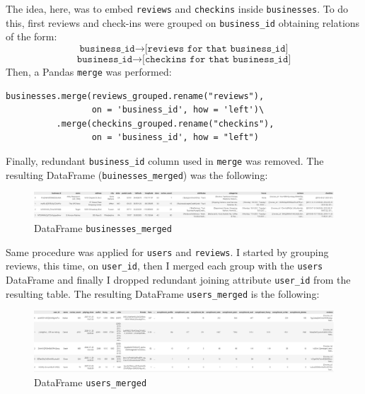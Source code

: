 \documentclass{Configuration_Files/PoliMi3i_thesis}
\begin{document}
The idea, here, was to embed \texttt{reviews} and \texttt{checkins} inside \texttt{businesses}. To do this, first reviews and check-ins were grouped on \texttt{business\_id} obtaining relations of the form:
$$\texttt{business\_id} \longrightarrow \texttt{[reviews for that business\_id]}$$
$$\texttt{business\_id} \longrightarrow \texttt{[checkins for that business\_id]}$$
Then, a Pandas \texttt{merge} was performed:

\bigskip

\begin{verbatim}
businesses.merge(reviews_grouped.rename("reviews"), 
                 on = 'business_id', how = 'left')\
          .merge(checkins_grouped.rename("checkins"), 
                 on = 'business_id', how = "left")
\end{verbatim}

\bigskip

Finally, redundant \texttt{business\_id} column used in \texttt{merge} was removed. The resulting DataFrame (\texttt{buinesses\_merged}) was the following:

\bigskip

\begin{figure}[H]
    \centering
    \includegraphics[width=1.1\columnwidth]{imgs/businesses_merged.png}
    \caption{DataFrame \texttt{businesses\_merged}}
    \label{fig:businesses_merged}
\end{figure}

\bigskip

Same procedure was applied for \texttt{users} and \texttt{reviews}. I started by grouping reviews, this time, on \texttt{user\_id}, then I merged each group with the \texttt{users} DataFrame and finally I dropped redundant joining attribute \texttt{user\_id} from the resulting table. The resulting DataFrame \texttt{users\_merged} is the following:

\bigskip

\begin{figure}[H]
    \centering
    \includegraphics[width=1.1\columnwidth]{imgs/users_merged.png}
    \caption{DataFrame \texttt{users\_merged}}
    \label{fig:users_merged}
\end{figure}
\end{document}
